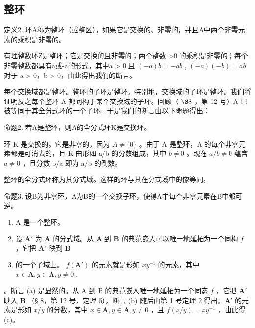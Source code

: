 \subsection{整环}

定义2. 环A称为整环（或整区），如果它是交换的、非零的，并且A中两个非零元素的乘积是非零的。

有理整数环Z是整环；它是交换的且非零的；两个整数 \textgreater0 的乘积是非零的；每个非零整数都具有a或-a的形式，其中a \textgreater{} 0 且 \((-a)b = -ab\) , \((-a)(-b) = ab\) 对于 a \textgreater{} 0，b \textgreater{} 0，由此得出我们的断言。

每个交换域都是整环。整环的子环是整环。特别地，交换域的子环是整环。我们将证明反之每个整环 A 都同构于某个交换域的子环。回顾（ \(\S 8\) ，第 12 号）A 已被等同于其全分式环的一个子环。于是我们的断言由以下命题得出：

命题2. 若A是整环，则A的全分式环K是交换环。

环 K 是交换的。它是非零的，因为 \(A \neq \{0\}\) 。由于 A 是整环，A 的每个非零元素都是可消去的，且 K 由形如 a/b 的分数组成，其中 \(b \neq 0\) 。现在 \(a/b \neq 0\) 蕴含 \(a \neq 0\) ，且分数 b/a 即为 a/b 的倒数。

整环的全分式环称为其分式域。这样的环与其在分式域中的像等同。

命题3. 设B为非零环，A为B的一个交换子环，使得A中每个非零元素在B中都可逆。

\begin{enumerate}
\def\labelenumi{(\alph{enumi})}
\item
  A 是一个整环。
\item
  设 \(\mathbf{A}'\) 为 \(\mathbf{A}\) 的分式域。从 \(\mathbf{A}\) 到 \(\mathbf{B}\) 的典范嵌入可以唯一地延拓为一个同构 \(f\) ，它把 \(\mathbf{A}'\) 映到 \(\mathbf{B}\)
\item
  的一个子域上。 \(f(\mathbf{A}')\) 的元素就是形如 \(xy^{-1}\) 的元素，其中 \(x \in \mathbf{A}, y \in \mathbf{A}, y \neq 0\) .
\end{enumerate}

。断言 (a) 是显然的。从 A 到 B 的典范嵌入唯一地延拓为一个同态 \(f\) ，它把 \(\mathbf{A}'\) 映入 \(\mathbf{B}\) （§ 8，第 12 号，定理 5）。断言 (b) 随后由第 1 号定理 2 得出。\(\mathbf{A}'\) 的元素是形如 \(x / y\) 的分数，其中 \(x \in \mathbf{A}, y \in \mathbf{A}, y \neq 0\) ，且 \(f(x / y) = xy^{-1}\) ，由此得 (c)。

